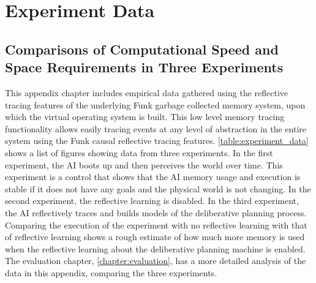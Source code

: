 \chapter{Experiment Data}
\label{chapter:experiment_data}

\section{Comparisons of Computational Speed and Space Requirements in Three Experiments}

This appendix chapter includes empirical data gathered using the
reflective tracing features of the underlying Funk garbage collected
memory system, upon which the virtual operating system is built.  This
low level memory tracing functionality allows easily tracing events at
any level of abstraction in the entire system using the Funk causal
reflective tracing features.  \autoref{table:experiment_data} shows a
list of figures showing data from three experiments.  In the first
experiment, the AI boots up and then perceives the world over time.
This experiment is a control that shows that the AI memory usage and
execution is stable if it does not have any goals and the physical
world is not changing.  In the second experiment, the reflective
learning is disabled.  In the third experiment, the AI reflectively
traces and builds models of the deliberative planning process.
Comparing the execution of the experiment with no reflective learning
with that of reflective learning shows a rough estimate of how much
more memory is used when the reflective learning about the
deliberative planning machine is enabled.  The evaluation chapter,
\autoref{chapter:evaluation}, has a more detailed analysis of the data
in this appendix, comparing the three experiments.

